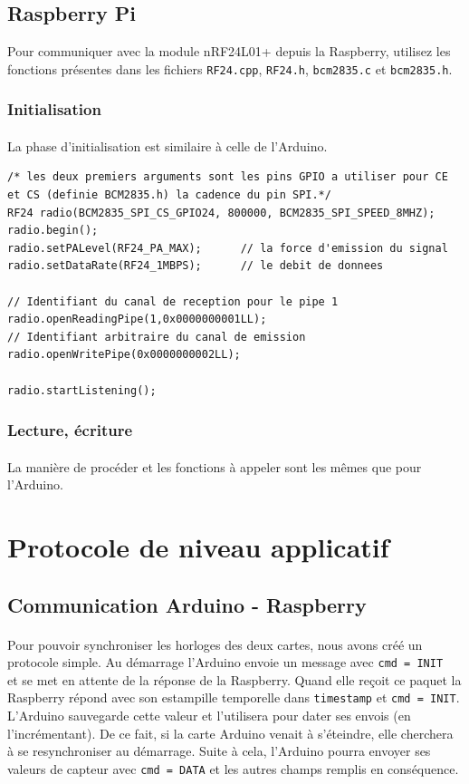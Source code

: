 \documentclass[a4paper, titlepage, oneside, 12pt]{article}%
\begin{document}
\subsection{Raspberry Pi}
Pour communiquer avec la module nRF24L01+ depuis la Raspberry, utilisez les fonctions présentes dans les fichiers \texttt{RF24.cpp}, \texttt{RF24.h}, \texttt{bcm2835.c} et \texttt{bcm2835.h}.

\subsubsection{Initialisation}
\paragraph{}
La phase d'initialisation est similaire à celle de l'Arduino. 

\begin{lstlisting}
/* les deux premiers arguments sont les pins GPIO a utiliser pour CE et CS (definie BCM2835.h) la cadence du pin SPI.*/
RF24 radio(BCM2835_SPI_CS_GPIO24, 800000, BCM2835_SPI_SPEED_8MHZ);
radio.begin();
radio.setPALevel(RF24_PA_MAX);		// la force d'emission du signal
radio.setDataRate(RF24_1MBPS);		// le debit de donnees

// Identifiant du canal de reception pour le pipe 1
radio.openReadingPipe(1,0x0000000001LL);		
// Identifiant arbitraire du canal de emission 
radio.openWritePipe(0x0000000002LL);

radio.startListening();
\end{lstlisting}

\subsubsection{Lecture, écriture}
\paragraph{}
La manière de procéder et les fonctions à appeler sont les mêmes que pour l'Arduino.

\section{Protocole de niveau applicatif}
\subsection{Communication Arduino - Raspberry}
\paragraph{}
Pour pouvoir synchroniser les horloges des deux cartes, nous avons créé un protocole simple.
Au démarrage l'Arduino envoie un message avec \texttt{cmd = INIT } et se met en attente de la réponse de la Raspberry. Quand elle reçoit ce paquet la Raspberry répond avec son estampille temporelle dans \texttt{timestamp} et \texttt{cmd = INIT}. L'Arduino sauvegarde cette valeur et l'utilisera pour dater ses envois (en l'incrémentant).
De ce fait, si la carte Arduino venait à s'éteindre, elle cherchera à se resynchroniser au démarrage.
Suite à cela, l'Arduino pourra envoyer ses valeurs de capteur avec \texttt{cmd = DATA} et les autres champs remplis en conséquence.
\end{document}
